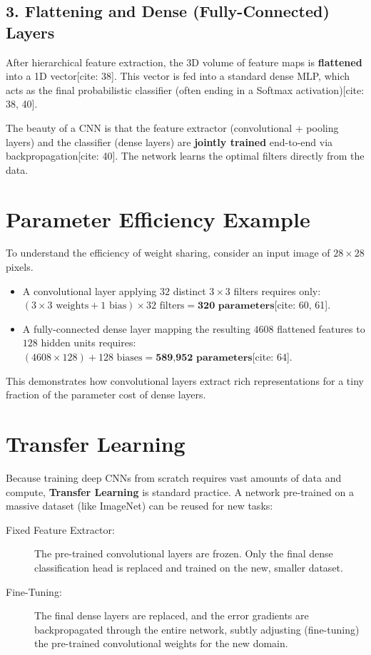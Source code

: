 \subsection*{3. Flattening and Dense (Fully-Connected) Layers}
After hierarchical feature extraction, the 3D volume of feature maps is \textbf{flattened} into a 1D vector[cite: 38]. This vector is fed into a standard dense MLP, which acts as the final probabilistic classifier (often ending in a Softmax activation)[cite: 38, 40].

\begin{remark}
The beauty of a CNN is that the feature extractor (convolutional + pooling layers) and the classifier (dense layers) are \textbf{jointly trained} end-to-end via backpropagation[cite: 40]. The network learns the optimal filters directly from the data.
\end{remark}

\section*{Parameter Efficiency Example}

To understand the efficiency of weight sharing, consider an input image of $28 \times 28$ pixels.
\begin{itemize}
    \item A convolutional layer applying $32$ distinct $3 \times 3$ filters requires only: \\
    $(3 \times 3 \text{ weights} + 1 \text{ bias}) \times 32 \text{ filters} = \textbf{320 parameters}$[cite: 60, 61].
    \item A fully-connected dense layer mapping the resulting $4608$ flattened features to $128$ hidden units requires: \\
    $(4608 \times 128) + 128 \text{ biases} = \textbf{589,952 parameters}$[cite: 64].
\end{itemize}
This demonstrates how convolutional layers extract rich representations for a tiny fraction of the parameter cost of dense layers.

\section*{Transfer Learning}

Because training deep CNNs from scratch requires vast amounts of data and compute, \textbf{Transfer Learning} is standard practice. A network pre-trained on a massive dataset (like ImageNet) can be reused for new tasks:
\begin{description}
    \item[Fixed Feature Extractor:] The pre-trained convolutional layers are frozen. Only the final dense classification head is replaced and trained on the new, smaller dataset.
    \item[Fine-Tuning:] The final dense layers are replaced, and the error gradients are backpropagated through the entire network, subtly adjusting (fine-tuning) the pre-trained convolutional weights for the new domain.
\end{description}
